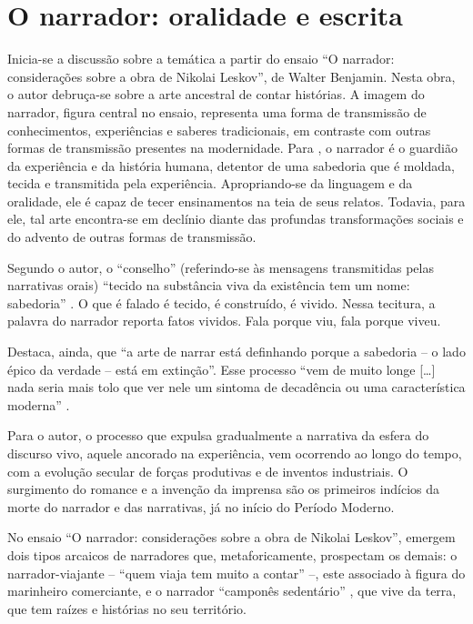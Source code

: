 \documentclass[portuguese]{textolivre}
\begin{document}
\section{O narrador: oralidade e escrita}

Inicia-se a discussão sobre a temática a partir do ensaio “O narrador: considerações sobre a obra de Nikolai Leskov”, de Walter Benjamin. Nesta obra, o autor debruça-se sobre a arte ancestral de contar histórias. A imagem do narrador, figura central no ensaio, representa uma forma de transmissão de conhecimentos, experiências e saberes tradicionais, em contraste com outras formas de transmissão presentes na modernidade. Para \textcite{Benjamin1985}, o narrador é o guardião da experiência e da história humana, detentor de uma sabedoria que é moldada, tecida e transmitida pela experiência. Apropriando-se da linguagem e da oralidade, ele é capaz de tecer ensinamentos na teia de seus relatos. Todavia, para ele, tal arte encontra-se em declínio diante das profundas transformações sociais e do advento de outras formas de transmissão.

Segundo o autor, o “conselho” (referindo-se às mensagens transmitidas pelas narrativas orais) “tecido na substância viva da existência tem um nome: sabedoria” \cite[p. 200]{Benjamin1985}. O que é falado é tecido, é construído, é vivido. Nessa tecitura, a palavra do narrador reporta fatos vividos. Fala porque viu, fala porque viveu.
    
Destaca, ainda, que “a arte de narrar está definhando porque a sabedoria – o lado épico da verdade – está em extinção”. Esse processo “vem de muito longe […] nada seria mais tolo que ver nele um sintoma de decadência ou uma característica moderna” \cite[p. 201]{Benjamin1985}.

Para o autor, o processo que expulsa gradualmente a narrativa da esfera do discurso vivo, aquele ancorado na experiência, vem ocorrendo ao longo do tempo, com a evolução secular de forças produtivas e de inventos industriais. O surgimento do romance e a invenção da imprensa são os primeiros indícios da morte do narrador e das narrativas, já no início do Período Moderno.

No ensaio “O narrador: considerações sobre a obra de Nikolai Leskov”, emergem dois tipos arcaicos de narradores que, metaforicamente, prospectam os demais: o narrador-viajante – “quem viaja tem muito a contar” –, este associado à figura do marinheiro comerciante, e o narrador “camponês sedentário” \cite[p. 198]{Benjamin1985}, que vive da terra, que tem raízes e histórias no seu território.
\end{document}
